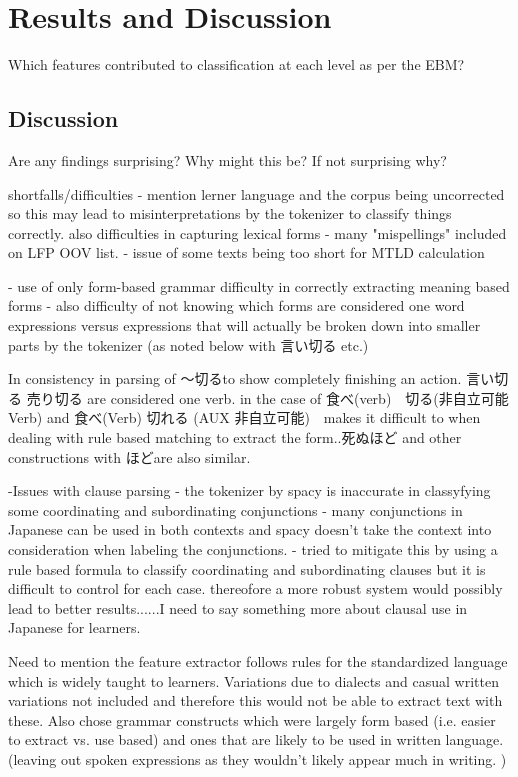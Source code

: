 \chapter{Results and Discussion}
Which features contributed to classification at each level as per the EBM?

\section{Discussion}
Are any findings surprising? Why might this be? If not surprising why?


shortfalls/difficulties
- mention lerner language and the corpus being uncorrected so this may lead to misinterpretations by the tokenizer to classify things correctly.
    also difficulties in capturing lexical forms - many "mispellings" included on LFP OOV list.
- issue of some texts being too short for MTLD calculation

- use of only form-based grammar difficulty in correctly extracting meaning based forms
- also difficulty of not knowing which forms are considered one word expressions versus expressions that will
actually be broken down into smaller parts by the tokenizer (as noted below with 言い切る etc.)

In consistency in parsing of 〜切るto show completely finishing an action. 言い切る 売り切る are considered one verb. in the
case of 食べ(verb)　切る(非自立可能Verb) and 食べ(Verb) 切れる (AUX 非自立可能)　makes it difficult to when dealing with rule based
matching to extract the form..死ぬほど and other constructions with ほどare also similar.

-Issues with clause parsing - the tokenizer by spacy is inaccurate in classyfying some coordinating and
subordinating conjunctions - many conjunctions in Japanese can be used in both contexts and spacy doesn't take the
context into consideration when labeling the conjunctions. - tried to mitigate this by using a rule based formula to
classify coordinating and subordinating clauses but it is difficult to control for each case. thereofore a more
robust system would possibly lead to better results......I need to say something more about clausal use in Japanese
for learners.


Need to mention the feature extractor follows rules for the standardized language which is widely taught to
learners. Variations due to dialects and casual written variations not included and therefore this would not be
able to extract text with these. Also chose grammar constructs which were largely form based (i.e. easier to extract
vs. use based) and ones that are likely to be used in written language. (leaving out spoken expressions as they
wouldn't likely appear much in writing. )